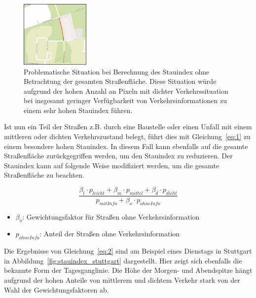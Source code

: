 \begin{figure}
  \centering
    \includegraphics[width=0.3\textwidth]{images/stauindex_problem.png}
    \caption{Problematische Situation bei Berechnung des Stauindex ohne Betrachtung der gesamten Straßenfläche. Diese Situation würde aufgrund der hohen Anzahl an Pixeln mit dichter Verkehrssituation bei insgesamt geringer Verfügbarkeit von Verkehrsinformationen zu einem sehr hohen Stauindex führen.}
    \label{fig:stauindex_problem}
\end{figure}

Ist nun ein Teil der Straßen z.B. durch eine Baustelle oder einen Unfall mit einem mittleren oder dichten Verkehrszustand belegt, führt dies mit Gleichung~\ref{eq:1} zu einem besondere hohen Stauindex. In diesem Fall kann ebenfalls auf die gesamte Straßenfläche zurückgegriffen werden, um den Stauindex zu reduzieren.
Der Stauindex kann auf folgende Weise modifiziert werden, um die gesamte Straßenfläche zu beachten.

\begin{equation}\label{eq:2}
\frac{\beta_l\cdot p_{leicht}+\beta_m\cdot p_{mittel}+\beta_d\cdot p_{dicht}}{p_{mit Info} + \beta_o\cdot p_{ohne Info}}
\end{equation}

\begin{itemize}
\item $\beta_o$: Gewichtungsfaktor für Straßen ohne Verkehrsinformation
\item $p_{ohne Info}$: Anteil der Straßen ohne Verkehrsinformation
\end{itemize}

\newpage

Die Ergebnisse von Gleichung~\ref{eq:2} sind am Beispiel eines Dienstags in Stuttgart in Abbildung~\ref{fig:stauindex_stuttgart} dargestellt. Hier zeigt sich ebenfalls die bekannte Form der Tagesganglinie. Die Höhe der Morgen- und Abendspitze hängt aufgrund der hohen Anteile von mittlerem und dichtem Verkehr stark von der Wahl der Gewichtungsfaktoren ab.\\

